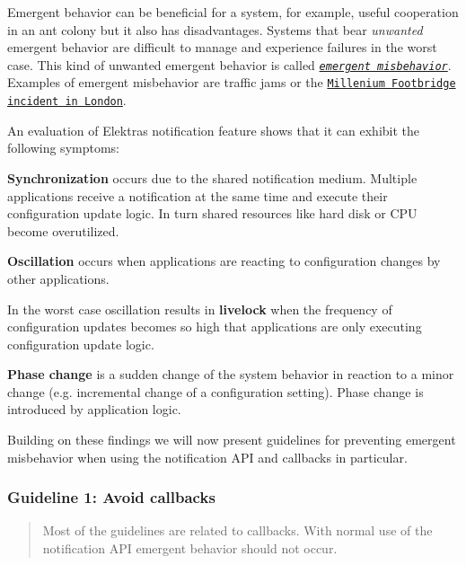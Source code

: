 Emergent behavior can be beneficial for a system, for example, useful cooperation in an ant colony but it also has disadvantages. Systems that bear {\itshape unwanted} emergent behavior are difficult to manage and experience failures in the worst case. This kind of unwanted emergent behavior is called \href{http://www.hpl.hp.com/techreports/2006/HPL-2006-2.html}{\tt {\itshape emergent misbehavior}}. Examples of emergent misbehavior are traffic jams or the \href{https://researchcourse.pbworks.com/f/structural+engineering.pdf}{\tt Millenium Footbridge} \href{https://www.sciencedaily.com/releases/2005/11/051103080801.htm}{\tt incident in London}.

An evaluation of Elektra\textquotesingle{}s notification feature shows that it can exhibit the following symptoms\+:


\begin{DoxyItemize}
\item {\bfseries Synchronization} occurs due to the shared notification medium. Multiple applications receive a notification at the same time and execute their configuration update logic. In turn shared resources like hard disk or C\+PU become overutilized.
\item {\bfseries Oscillation} occurs when applications are reacting to configuration changes by other applications.
\item In the worst case oscillation results in {\bfseries livelock} when the frequency of configuration updates becomes so high that applications are only executing configuration update logic.
\item {\bfseries Phase change} is a sudden change of the system behavior in reaction to a minor change (e.\+g. incremental change of a configuration setting). Phase change is introduced by application logic.
\end{DoxyItemize}

Building on these findings we will now present guidelines for preventing emergent misbehavior when using the notification A\+PI and callbacks in particular.

\subsubsection*{Guideline 1\+: Avoid callbacks}

\begin{quote}
Most of the guidelines are related to callbacks. With normal use of the notification A\+PI emergent behavior should not occur. \end{quote}


